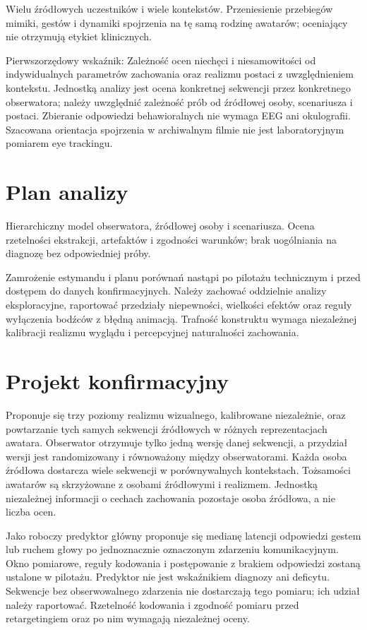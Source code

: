 \documentclass[11pt,a4paper]{article}
\begin{document}
Wielu źródłowych uczestników i wiele kontekstów. Przeniesienie przebiegów mimiki, gestów i dynamiki spojrzenia na tę samą rodzinę awatarów; oceniający nie otrzymują etykiet klinicznych.

Pierwszorzędowy wskaźnik: Zależność ocen niechęci i niesamowitości od indywidualnych parametrów zachowania oraz realizmu postaci z uwzględnieniem kontekstu. Jednostką analizy jest ocena konkretnej sekwencji przez konkretnego obserwatora; należy uwzględnić zależność prób od źródłowej osoby, scenariusza i postaci. Zbieranie odpowiedzi behawioralnych nie wymaga EEG ani okulografii. Szacowana orientacja spojrzenia w archiwalnym filmie nie jest laboratoryjnym pomiarem eye trackingu.
\section{Plan analizy}
Hierarchiczny model obserwatora, źródłowej osoby i scenariusza. Ocena rzetelności ekstrakcji, artefaktów i zgodności warunków; brak uogólniania na diagnozę bez odpowiedniej próby.

Zamrożenie estymandu i planu porównań nastąpi po pilotażu technicznym i przed dostępem do danych konfirmacyjnych. Należy zachować oddzielnie analizy eksploracyjne, raportować przedziały niepewności, wielkości efektów oraz reguły wyłączenia bodźców z błędną animacją. Trafność konstruktu wymaga niezależnej kalibracji realizmu wyglądu i percepcyjnej naturalności zachowania.
\section{Projekt konfirmacyjny}
Proponuje się trzy poziomy realizmu wizualnego, kalibrowane niezależnie, oraz powtarzanie tych samych sekwencji źródłowych w różnych reprezentacjach awatara. Obserwator otrzymuje tylko jedną wersję danej sekwencji, a przydział wersji jest randomizowany i równoważony między obserwatorami. Każda osoba źródłowa dostarcza wiele sekwencji w porównywalnych kontekstach. Tożsamości awatarów są skrzyżowane z osobami źródłowymi i realizmem. Jednostką niezależnej informacji o cechach zachowania pozostaje osoba źródłowa, a nie liczba ocen.

Jako roboczy predyktor główny proponuje się medianę latencji odpowiedzi gestem lub ruchem głowy po jednoznacznie oznaczonym zdarzeniu komunikacyjnym. Okno pomiarowe, reguły kodowania i postępowanie z brakiem odpowiedzi zostaną ustalone w pilotażu. Predyktor nie jest wskaźnikiem diagnozy ani deficytu. Sekwencje bez obserwowalnego zdarzenia nie dostarczają tego pomiaru; ich udział należy raportować. Rzetelność kodowania i zgodność pomiaru przed retargetingiem oraz po nim wymagają niezależnej oceny.
\end{document}
